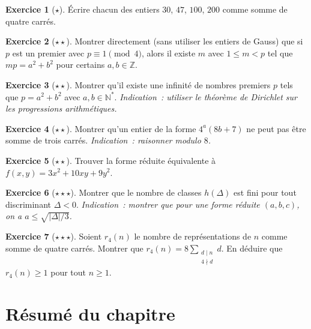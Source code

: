 \documentclass[12pt,a4paper,openany]{book}
\theoremstyle{definition}
\newtheorem{exercice}{Exercice}[chapter]
\theoremstyle{plain}
\theoremstyle{remark}
\newcommand{\N}{\mathbb{N}}
\newcommand{\Z}{\mathbb{Z}}
\newcommand{\abs}[1]{\left|#1\right|}
\begin{document}
\begin{exercice}[$\star$]
\label{exo:quatre-carres}
Écrire chacun des entiers $30$, $47$, $100$, $200$ comme somme de quatre carrés.
\end{exercice}

\begin{exercice}[$\star\star$]
\label{exo:produit-sommes}
Montrer directement (sans utiliser les entiers de Gauss) que si $p$ est un premier avec
$p \equiv 1 \pmod{4}$, alors il existe $m$ avec $1 \leq m < p$ tel que $mp = a^2 + b^2$
pour certains $a, b \in \Z$.
\end{exercice}

\begin{exercice}[$\star\star$]
\label{exo:infini-sommes}
Montrer qu'il existe une infinité de nombres premiers $p$ tels que $p = a^2 + b^2$ avec
$a, b \in \N^*$.
\textit{Indication~: utiliser le théorème de Dirichlet sur les progressions arithmétiques.}
\end{exercice}

\begin{exercice}[$\star\star$]
\label{exo:trois-carres-exclusion}
Montrer qu'un entier de la forme $4^a(8b+7)$ ne peut pas être somme de trois carrés.
\textit{Indication~: raisonner modulo $8$.}
\end{exercice}

\begin{exercice}[$\star\star$]
\label{exo:forme-reduction}
Trouver la forme réduite équivalente à $f(x,y) = 3x^2 + 10xy + 9y^2$.
\end{exercice}

\begin{exercice}[$\star\star\star$]
\label{exo:nombre-classes}
Montrer que le nombre de classes $h(\Delta)$ est fini pour tout discriminant $\Delta < 0$.
\textit{Indication~: montrer que pour une forme réduite $(a,b,c)$, on a
$a \leq \sqrt{\abs{\Delta}/3}$.}
\end{exercice}

\begin{exercice}[$\star\star\star$]
\label{exo:jacobi-r4}
Soient $r_4(n)$ le nombre de représentations de $n$ comme somme de quatre carrés. Montrer
que $r_4(n) = 8\sum_{\substack{d \mid n \\ 4 \nmid d}} d$. En déduire que $r_4(n) \geq 1$
pour tout $n \geq 1$.
\end{exercice}

\section*{Résumé du chapitre}
\end{document}
